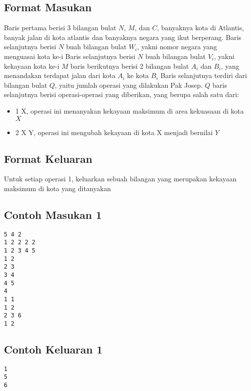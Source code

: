 \documentclass{article}
\begin{document}


\subsection*{Format Masukan}

Baris pertama berisi 3 bilangan bulat $N$, $M$, dan $C$, banyaknya kota di Atlantis, banyak jalan di kota atlantis dan banyaknya negara yang ikut berperang. 
Baris selanjutnya berisi $N$ buah bilangan bulat $W_i$, yakni nomor negara yang menguasai kota ke-i 
Baris selanjutnya berisi $N$ buah bilangan bulat $V_i$, yakni kekayaan kota ke-i
$M$ baris berikutnya berisi 2 bilangan bulat $A_i$ dan $B_i$, yang menandakan terdapat jalan dari kota $A_i$ ke kota $B_i$
Baris selanjutnya terdiri dari bilangan bulat $Q$, yaitu jumlah operasi yang dilakukan Pak Josep.
$Q$ baris selanjutnya berisi operasi-operasi yang diberikan, yang berupa salah satu dari:
\begin{itemize}
    \item 1 X, operasi ini menanyakan kekayaan maksimum di area kekuasaan di kota $X$
    \item 2 X Y, operasi ini mengubah kekayaan di kota X menjadi bernilai $Y$
\end{itemize}

\subsection*{Format Keluaran}
Untuk setiap operasi 1, keluarkan sebuah bilangan yang merupakan kekayaan maksimum di kota yang ditanyakan

\begin{multicols}{2}
\subsection*{Contoh Masukan 1}
\begin{lstlisting}
5 4 2
1 2 2 2 2
1 2 3 4 5
1 2
2 3
3 4
4 5
4
1 1
1 2
2 3 6
1 2
\end{lstlisting}
\columnbreak
\subsection*{Contoh Keluaran 1}
\begin{lstlisting}
1
5
6
\end{lstlisting}
\end{multicols}



\pagebreak
\end{document}
